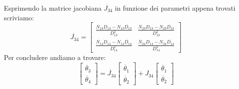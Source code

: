 Esprimendo la matrice jacobiana $\dot{J_{34}}$ in funzione dei parametri appena trovati scriviamo:
\begin{equation}
    \dot{J_{34}} =
    \begin{bmatrix}
    \frac{\dot{N_{13}}D_{13}-N_{13}\dot{D_{13}}}{D_{13}^2} & 
     \frac{\dot{N_{23}}D_{13}-N_{23}\dot{D_{13}}}{D_{13}^2} \\
    \frac{\dot{N_{14}}D_{14}-N_{14}\dot{D_{14}}}{D_{14}^2} &
     \frac{\dot{N_{24}}D_{14}-N_{24}\dot{D_{14}}}{D_{14}^2}
    \end{bmatrix}
\end{equation}
Per concludere andiamo a trovare:
\begin{equation}
    \begin{bmatrix}
    \ddot{\theta_3} \\ \ddot{\theta_4}
    \end{bmatrix}
    = 
    \dot{J_{34}}\begin{bmatrix}
    \dot{\theta_1} \\ \dot{\theta_2}
    \end{bmatrix} + 
    J_{34} \begin{bmatrix}
    \ddot{\theta_1} \\ \ddot{\theta_2}
    \end{bmatrix}
\end{equation}
